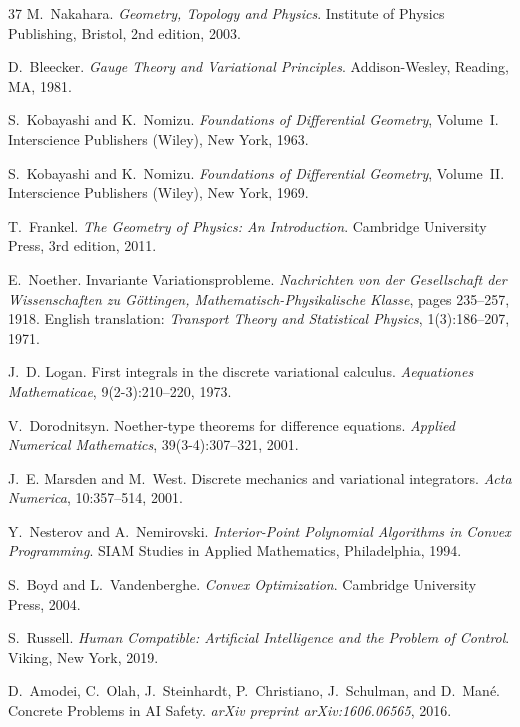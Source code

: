 \documentclass[12pt]{article}
\begin{document}
\begin{thebibliography}{37}
M.~Nakahara.
\newblock \emph{Geometry, Topology and Physics}.
\newblock Institute of Physics Publishing, Bristol, 2nd edition, 2003.

D.~Bleecker.
\newblock \emph{Gauge Theory and Variational Principles}.
\newblock Addison-Wesley, Reading, MA, 1981.

S.~Kobayashi and K.~Nomizu.
\newblock \emph{Foundations of Differential Geometry}, Volume~I.
\newblock Interscience Publishers (Wiley), New York, 1963.

S.~Kobayashi and K.~Nomizu.
\newblock \emph{Foundations of Differential Geometry}, Volume~II.
\newblock Interscience Publishers (Wiley), New York, 1969.

T.~Frankel.
\newblock \emph{The Geometry of Physics: An Introduction}.
\newblock Cambridge University Press, 3rd edition, 2011.

E.~Noether.
\newblock Invariante Variationsprobleme.
\newblock \emph{Nachrichten von der Gesellschaft der Wissenschaften zu G\"{o}ttingen, Mathematisch-Physikalische Klasse}, pages 235--257, 1918.
\newblock English translation: \emph{Transport Theory and Statistical Physics}, 1(3):186--207, 1971.

J.~D. Logan.
\newblock First integrals in the discrete variational calculus.
\newblock \emph{Aequationes Mathematicae}, 9(2-3):210--220, 1973.

V.~Dorodnitsyn.
\newblock Noether-type theorems for difference equations.
\newblock \emph{Applied Numerical Mathematics}, 39(3-4):307--321, 2001.

J.~E. Marsden and M.~West.
\newblock Discrete mechanics and variational integrators.
\newblock \emph{Acta Numerica}, 10:357--514, 2001.

Y.~Nesterov and A.~Nemirovski.
\newblock \emph{Interior-Point Polynomial Algorithms in Convex Programming}.
\newblock SIAM Studies in Applied Mathematics, Philadelphia, 1994.

S.~Boyd and L.~Vandenberghe.
\newblock \emph{Convex Optimization}.
\newblock Cambridge University Press, 2004.

S.~Russell.
\newblock \emph{Human Compatible: Artificial Intelligence and the Problem of Control}.
\newblock Viking, New York, 2019.

D.~Amodei, C.~Olah, J.~Steinhardt, P.~Christiano, J.~Schulman, and D.~Man\'{e}.
\newblock Concrete Problems in AI Safety.
\newblock \emph{arXiv preprint arXiv:1606.06565}, 2016.


\end{thebibliography}
\end{document}
